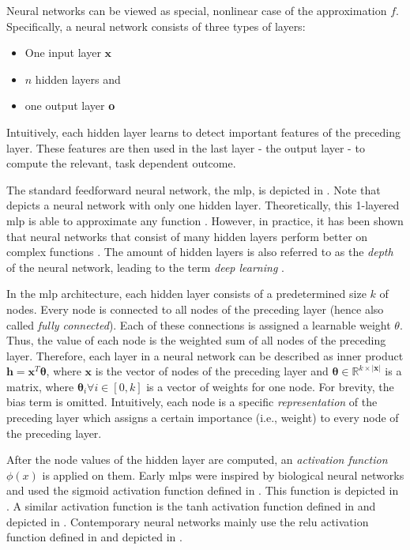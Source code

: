 Neural networks \citep{Rosenblatt58theperceptron} can be viewed as special, nonlinear case of the approximation $f$. Specifically, a neural network consists of three types of layers:
\begin{itemize}
	\item One input layer $\textbf{x}$
    \item $n$ hidden layers and
	\item one output layer \textbf{o}
\end{itemize}

Intuitively, each hidden layer learns to detect important features of the preceding layer. These features are then used in the last layer - the output layer - to compute the relevant, task dependent outcome.

The  standard feedforward neural network, the \gls{mlp}, is depicted in . Note that  depicts a neural network with only one hidden layer. Theoretically, this 1-layered \gls{mlp} is able to approximate any function \citep{DBLP:journals/nn/HornikSW89,DBLP:journals/mcss/Cybenko89}. However, in practice, it has been shown that neural networks that consist of many hidden layers perform better on complex functions \citep{DBLP:journals/tc/Amari67,DBLP:conf/icml/SafranS17,DBLP:journals/nn/PetersenV18}. The amount of hidden layers is also referred to as the \emph{depth} of the neural network, leading to the term \emph{deep learning}  \citep{DBLP:conf/aaai/Dechter86,DBLP:journals/tnn/ChenKKH01a}.

In the \gls{mlp} architecture, each hidden layer consists of a predetermined size $k$ of nodes. Every node is connected to all nodes of the preceding layer (hence also called \emph{fully connected}). Each of these connections is assigned a learnable weight $\theta$. Thus, the value of each node is the weighted sum of all nodes of the preceding layer. Therefore, each layer in a neural network can be described as inner product $\textbf{h}=\textbf{x}^T \boldsymbol{\theta}$, where $\textbf{x}$ is the vector of nodes of the preceding layer and $\boldsymbol{\theta}\in \mathbb{R}^{k\times|\textbf{x}|}$ is a matrix, where $\boldsymbol{\theta}_i \forall i \in [0,k]$ is a vector of weights for one node. For brevity, the bias term is omitted. Intuitively, each node is a specific \emph{representation} of the preceding layer which assigns a certain importance (i.e., weight) to every node of the preceding layer.

After the node values of the hidden layer are computed, an \emph{activation function} $\phi(x)$ is applied on them. Early \glspl{mlp} were inspired by biological neural networks and used the sigmoid activation function defined in . This function is depicted in . A similar activation function is the tanh activation function defined in  and depicted in . Contemporary neural networks mainly use the \gls{relu} activation function \citep{Nair:2010:RLU:3104322.3104425} defined in  and depicted in . 

